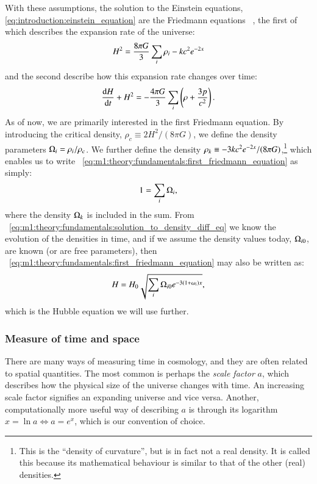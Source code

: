    With these assumptions, the solution to the Einstein equations, \cref{eq:introduction:einstein_equation} are the Friedmann equations ~\cite[ch. 8.3]{carroll_2019}, the first of which describes the expansion rate of the universe:
    \begin{equation}
        \label{eq:m1:theory:fundamentals:first_friedmann_equation}
        H^2 = \frac{8\pi G}{3}\sum_i\rho_i - kc^2e^{-2x} \\
    \end{equation}
    and the second describe how this expansion rate changes over time:
    \begin{equation}
        \label{eq:m1:theory:fundamentals:second_friedmann_equation}
        \dv{H}{t}+H^2 = -\frac{4\pi G}{3}\sum_i\left(\rho+\frac{3p}{c^2}\right).
    \end{equation}
    As of now, we are primarily interested in the first Friedmann equation. By introducing the critical density, $\rho_c\equiv2H^2/(8\pi G)$, we define the density parameters $\Omega_i=\rho_i/\rho_c$. We further define the density $\rho_k\equiv-3kc^2e^{-2x}/(8\pi G)$,\footnote{This is the ``density of curvature'', but is in fact not a real density. It is called this because its mathematical behaviour is similar to that of the other (real) densities.} which enables us to write ~\cref{eq:m1:theory:fundamentals:first_friedmann_equation} as simply:
    \begin{equation}
        1=\sum_i\Omega_i,
    \end{equation}
    where the density $\Omega_k$ is included in the sum. From ~\cref{eq:m1:theory:fundamentals:solution_to_density_diff_eq} we know the evolution of the densities in time, and if we assume the density values today, $\Omega_{i0}$, are known (or are free parameters), then ~\cref{eq:m1:theory:fundamentals:first_friedmann_equation} may also be written as:
    \begin{equation}\label{eq:m1:theory:fundamentals:Hubble_equation}
        H = H_0\sqrt{\sum_i\Omega_{i0}e^{-3(1+\omega_i)x}},
    \end{equation}
    which is the Hubble equation we will use further.


\subsubsection{Measure of time and space}\label{sec:m1:measure_time_space}
    There are many ways of measuring time in cosmology, and they are often related to spatial quantities. The most common is perhaps the \textit{scale factor} $a$, which describes how the physical size of the universe changes with time. An increasing scale factor signifies an expanding universe and vice versa. Another, computationally more useful way of describing $a$ is through its logarithm $x=\ln a \iff a=e^x$, which is our convention of choice.
    
